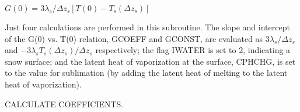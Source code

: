 $G(0) = 3 \lambda_s / \Delta z_s [T(0) - T_s(\Delta z_s)]$

Just four calculations are performed in this subroutine. The slope and intercept of the G(0) vs. T(0) relation, G\+C\+O\+E\+F\+F and G\+C\+O\+N\+S\+T, are evaluated as $3 \lambda_s / \Delta z_s$ and $-3 \lambda_s T_s(\Delta z_s)/ \Delta z_s$ respectively; the flag I\+W\+A\+T\+E\+R is set to 2, indicating a snow surface; and the latent heat of vaporization at the surface, C\+P\+H\+C\+H\+G, is set to the value for sublimation (by adding the latent heat of melting to the latent heat of vaporization).


\begin{DoxyItemize}
\item C\+A\+L\+C\+U\+L\+A\+T\+E C\+O\+E\+F\+F\+I\+C\+I\+E\+N\+T\+S.
\end{DoxyItemize}